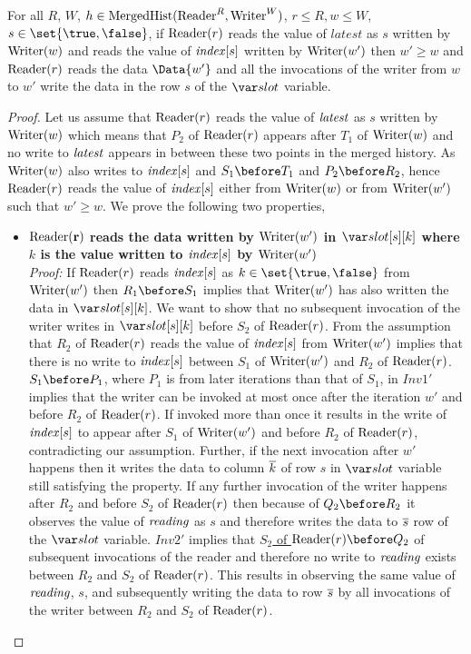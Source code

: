 \begin{description}
\begin{lemma}
 For all $R$, $W$, $h\in \mathrm{MergedHist}(\mathrm{Reader}^R,\mathrm{Writer}^W)$, $r\le R, w\le W$, $s\in \set{\true,\false}$, if $\mathrm{Reader}(r)$ reads the value of $latest$ as $s$ written by $\mathrm{Writer}(w)$ 
 and reads the value of $\mathit{index}[s]$ written by $\mathrm{Writer}(w')$ then $w'\ge w$ and $\mathrm{Reader}(r)$ reads the data $\Data{w'}$ and 
 all the invocations of the writer from $w$ to $w'$ write the data in the row $s$ of the $\slot$ variable.
\end{lemma}
\begin{proof}
Let us assume that $\mathrm{Reader}(r)$ reads the value of $\mathit{latest}$ as $s$ written by $\mathrm{Writer}(w)$ which means that $P_2$ of $\mathrm{Reader}(r)$ appears after $T_1$ of $\mathrm{Writer}(w)$ and no write to $\mathit{latest}$ appears in between these two points in the merged history. As $\mathrm{Writer}(w)$ also writes to $\mathit{index}[s]$ and \ul{$S_1\before T_1$} and \ul{$P_2\before R_2$}, hence $\mathrm{Reader}(r)$ reads the value of $\mathit{index}[s]$ either from $\mathrm{Writer}(w)$ or from $\mathrm{Writer}(w')$ such that $w'\ge w$. We prove the following two properties,
\begin{itemize}
 \item \textbf{$\mathbf{\mathrm{Reader}(r)}$ reads the data written by $\mathrm{Writer}(w')$ in $\slot[s][k]$ where $k$ is the value written to $\mathit{index}[s]$ by $\mathrm{Writer}(w')$} \\
\emph{Proof:} If $\mathrm{Reader}(r)$ reads $\mathit{index}[s]$ as $k\in \set{\true,\false}$ from $\mathrm{Writer}(w')$ then \ul{$R_1\before S_1$} implies that $\mathrm{Writer}(w')$ has also written the data in $\slot[s][k]$. We want to show that 
no subsequent invocation of the writer writes in $\slot[s][k]$ before $S_2$ of $\mathrm{Reader}(r)$. From the assumption that $R_2$ of $\mathrm{Reader}(r)$ reads the value of $\mathit{index}[s]$ from $\mathrm{Writer}(w')$ implies that there is no write to $\mathit{index}[s]$ between $S_1$ of $\mathrm{Writer}(w')$ and $R_2$ of $\mathrm{Reader}(r)$. \ul{$S_1 \before P_1$}, where $P_1$ is from later iterations than 
that of $S_1$, in $Inv1'$ implies that the writer can be invoked at most once after the iteration $w'$ and before $R_2$ of $\mathrm{Reader}(r)$. If invoked more than once it results in the write of $\mathit{index}[s]$ to appear after $S_1$ of $\mathrm{Writer}(w')$ and before $R_2$ of $\mathrm{Reader}(r)$, contradicting our assumption. Further, if the next invocation after $w'$ happens then it writes the data to column $\overline{k}$ of row $s$ in $\slot$ variable still satisfying the property. If any further invocation of the writer happens after $R_2$ and before $S_2$ of $\mathrm{Reader}(r)$ then because of \ul{$Q_2\before R_2$} it observes the 
value of $\mathit{reading}$ as $s$ and therefore writes the data to $\overline{s}$ row of the $\slot$ variable. $Inv2'$ implies that \ul{$S_2$ of $\Reader(r) \before Q_2$} of subsequent invocations of the reader and therefore no write to $\mathit{reading}$ exists between $R_2$ and $S_2$ of $\mathrm{Reader}(r)$. This results in observing the same value of $\mathit{reading}$, $s$, and subsequently writing the data to row $\overline{s}$ by all invocations of the writer between $R_2$ and $S_2$ of $\mathrm{Reader}(r)$.


\end{itemize}
\end{proof}
\end{description}
